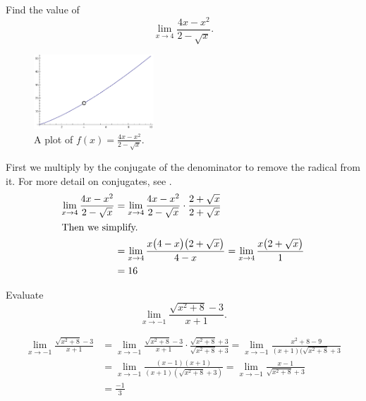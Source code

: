 \begin{ex}
  Find the value of
  \[ \lim_{x \to 4} \frac{4x-x^2}{2-\sqrt x} \text{.} \]
    \begin{figure}[h]
      \begin{center}
        \includegraphics[width=0.4\textwidth]{continuous/limits/4xmx2}
      \end{center}
      \caption{A plot of $f(x)=\frac{4x-x^2}{2-\sqrt x}$.}
    \end{figure}
  \begin{sol}
    First we multiply by the conjugate of the denominator to remove the radical from it. For more detail on conjugates, see .
    \begin{align*}
      \lim_{x \to 4} \frac{4x-x^2}{2-\sqrt x}
      &= \lim_{x \to 4} \frac{4x-x^2}{2-\sqrt x} \cdot \frac{2+\sqrt x}{2+\sqrt x}\\
      \intertext{Then we simplify.}
      &=\lim_{x \to 4} \frac{x\big(4-x\big)\big(2+\sqrt{x}\big)}{4-x}
       = \lim_{x \to 4} \frac{x\big(2+\sqrt{x}\big)}{1} \\
      &= 16
    \end{align*}
  \end{sol}
\end{ex}
\begin{ex}
  Evaluate
  \[ \lim_{x \to -1} \frac{\sqrt{x^2+8}-3}{x+1} \text{.} \]
  \begin{sol}
    \begin{align*}
      \lim_{x \to -1} \frac{\sqrt{x^2+8}-3}{x+1}
      &= \lim_{x \to -1} \frac{\sqrt{x^2+8}-3}{x+1} \cdot \frac{\sqrt{x^2+8}+3}{\sqrt{x^2+8}+3}
      = \lim_{x \to -1} \frac{x^2+8-9}{(x+1)(\sqrt{x^2+8}+3} \\
      &= \lim_{x \to -1} \frac{(x-1)(x+1)}{(x+1)(\sqrt{x^2+8}+3)}
      = \lim_{x \to -1} \frac{x-1}{\sqrt{x^2+8}+3} \\
      &= \frac{-1}{3}
    \end{align*}
  \end{sol}
\end{ex}
